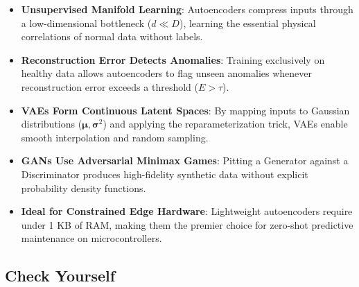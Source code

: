 \begin{takeaways}
\begin{itemize}
    \item \textbf{Unsupervised Manifold Learning}: Autoencoders compress inputs through a low-dimensional bottleneck ($d \ll D$), learning the essential physical correlations of normal data without labels.
    \item \textbf{Reconstruction Error Detects Anomalies}: Training exclusively on healthy data allows autoencoders to flag unseen anomalies whenever reconstruction error exceeds a threshold ($E > \tau$).
    \item \textbf{VAEs Form Continuous Latent Spaces}: By mapping inputs to Gaussian distributions ($\boldsymbol{\mu}, \boldsymbol{\sigma}^2$) and applying the reparameterization trick, VAEs enable smooth interpolation and random sampling.
    \item \textbf{GANs Use Adversarial Minimax Games}: Pitting a Generator against a Discriminator produces high-fidelity synthetic data without explicit probability density functions.
    \item \textbf{Ideal for Constrained Edge Hardware}: Lightweight autoencoders require under 1 KB of RAM, making them the premier choice for zero-shot predictive maintenance on microcontrollers.
\end{itemize}
\end{takeaways}

\subsection{Check Yourself}\label{subsec:check_yourself}

